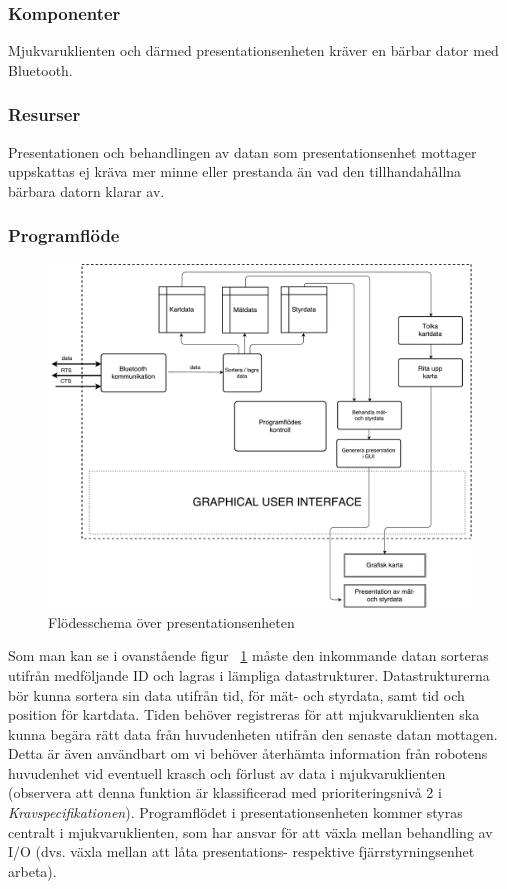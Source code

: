 \documentclass{article}
\begin{document}
\subsubsection{Komponenter}
Mjukvaruklienten och därmed presentationsenheten kräver en bärbar dator med Bluetooth. 

\subsubsection{Resurser}
Presentationen och behandlingen av datan som presentationsenhet mottager uppskattas ej kräva mer minne eller prestanda än vad den tillhandahållna bärbara datorn klarar av.

\subsubsection{Programflöde}
\begin{figure}[H]
\centering 
\includegraphics[scale=0.3]{Presentationsenhet3}
\caption{Flödesschema över presentationsenheten}
\label{fig:Presentationsenhet3}
\end{figure}
Som man kan se i ovanstående figur ~\ref{fig:Presentationsenhet3} måste den inkommande datan sorteras utifrån medföljande ID och lagras i lämpliga datastrukturer. Datastrukturerna bör kunna sortera sin data utifrån tid, för mät- och styrdata, samt tid och position för kartdata. Tiden behöver registreras för att mjukvaruklienten ska kunna begära rätt data från huvudenheten utifrån den senaste datan mottagen. Detta är även användbart om vi behöver återhämta information från robotens huvudenhet vid eventuell krasch och förlust av data i mjukvaruklienten (observera att denna funktion är klassificerad med prioriteringsnivå 2 i \textit{Kravspecifikationen}). Programflödet i presentationsenheten kommer styras centralt i mjukvaruklienten, som har ansvar för att växla mellan behandling av I/O (dvs. växla mellan att låta presentations- respektive fjärrstyrningsenhet arbeta). 
\end{document}
